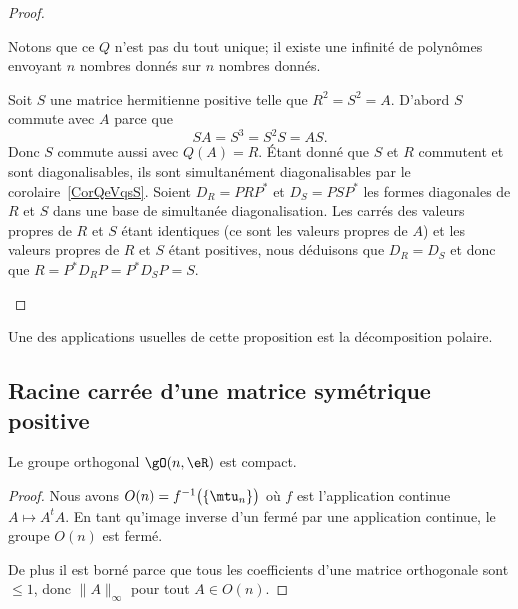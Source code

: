 \begin{proof}
\begin{subproof}
		Notons que ce \( Q\) n'est pas du tout unique; il existe une infinité de polynômes envoyant \( n\) nombres donnés sur \( n\) nombres donnés.

		\spitem[Unicité]
		Soit \( S\) une matrice hermitienne positive telle que \( R^2=S^2=A\). D'abord \( S\) commute avec \( A\) parce que
		\begin{equation}
			SA=S^3=S^2S=AS.
		\end{equation}
		Donc \( S\) commute aussi avec \( Q(A)=R\). Étant donné que \( S\) et \( R\) commutent et sont diagonalisables, ils sont simultanément diagonalisables par le corolaire~\ref{CorQeVqsS}. Soient \( D_R=PRP^*\) et \( D_S=PSP^*\) les formes diagonales de \( R\) et \( S\) dans une base de simultanée diagonalisation. Les carrés des valeurs propres de \( R\) et \( S\) étant identiques (ce sont les valeurs propres de \( A\)) et les valeurs propres de \( R\) et \( S\) étant positives, nous déduisons que \( D_R=D_S\) et donc que \( R=P^*D_RP=P^*D_SP=S\).
	\end{subproof}
\end{proof}

Une des applications usuelles de cette proposition est la décomposition polaire.

\subsection{Racine carrée d'une matrice symétrique positive}

\begin{lemma}   \label{LemTLlTAAf}
	Le groupe orthogonal \( \gO(n,\eR) \) est compact.
\end{lemma}

\begin{proof}
	Nous avons \( O(n)=f^{-1}\big( \{ \mtu_n \} \big)\) où \( f\) est l'application continue \( A\mapsto A^tA\). En tant qu'image inverse d'un fermé par une application continue, le groupe \( O(n)\) est fermé.

	De plus il est borné parce que tous les coefficients d'une matrice orthogonale sont \( \leq 1\), donc \( \| A \|_{\infty}\) pour tout \( A\in O(n)\).
\end{proof}

